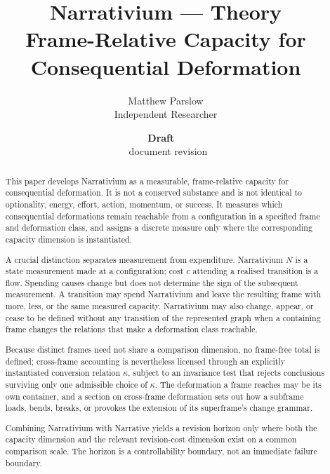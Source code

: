 \documentclass[11pt,a4paper]{article}
\title{Narrativium --- Theory\\
\large Frame-Relative Capacity for Consequential Deformation}
\author{Matthew Parslow\\Independent Researcher}
\date{\textbf{Draft \texorpdfstring{\textemdash}{---}\ \PaperDraft}\\[2pt]\PaperDisplayDate \texorpdfstring{\textbullet}{\textperiodcentered}\ document revision \PaperRevision}
\theoremstyle{remark}
\begin{document}
\maketitle
\begin{center}
\end{center}
\vspace{1em}


\begin{abstract}
This paper develops Narrativium as a measurable, frame-relative capacity for consequential deformation. It is not a conserved substance and is not identical to optionality, energy, effort, action, momentum, or success. It measures which consequential deformations remain reachable from a configuration in a specified frame and deformation class, and assigns a discrete measure only where the corresponding capacity dimension is instantiated.

A crucial distinction separates measurement from expenditure. Narrativium $N$ is a state measurement made at a configuration; cost $c$ attending a realised transition is a flow. Spending causes change but does not determine the sign of the subsequent measurement. A transition may spend Narrativium and leave the resulting frame with more, less, or the same measured capacity. Narrativium may also change, appear, or cease to be defined without any transition of the represented graph when a containing frame changes the relations that make a deformation class reachable.

Because distinct frames need not share a comparison dimension, no frame-free total is defined; cross-frame accounting is nevertheless licensed through an explicitly instantiated conversion relation $\kappa$, subject to an invariance test that rejects conclusions surviving only one admissible choice of $\kappa$. The deformation a frame reaches may be its own container, and a section on cross-frame deformation sets out how a subframe loads, bends, breaks, or provokes the extension of its superframe's change grammar.

Combining Narrativium with Narrative yields a revision horizon only where both the capacity dimension and the relevant revision-cost dimension exist on a common comparison scale. The horizon is a controllability boundary, not an immediate failure boundary.
\end{abstract}
\end{document}
